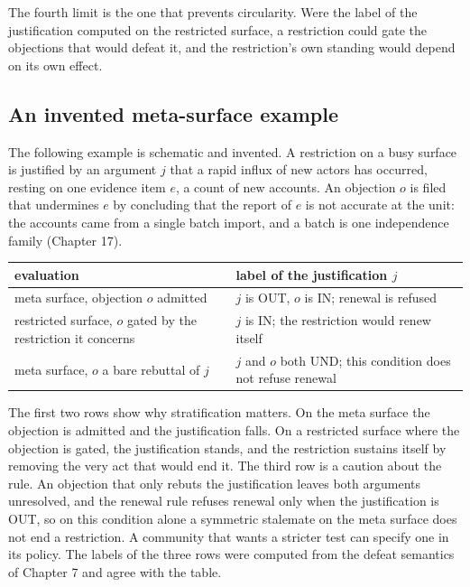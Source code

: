 \documentclass[11pt]{article}
\newcommand{\IN}{\textsf{IN}}
\newcommand{\UND}{\textsf{UND}}
\newcommand{\OUT}{\textsf{OUT}}
\begin{document}
The fourth limit is the one that prevents circularity. Were the label of the justification computed on the restricted surface, a restriction could gate the objections that would defeat it, and the restriction's own standing would depend on its own effect.

\subsection{An invented meta-surface example}

The following example is schematic and invented. A restriction on a busy surface is justified by an argument $j$ that a rapid influx of new actors has occurred, resting on one evidence item $e$, a count of new accounts. An objection $o$ is filed that undermines $e$ by concluding that the report of $e$ is not accurate at the unit: the accounts came from a single batch import, and a batch is one independence family (Chapter 17).

\begin{center}
\small
\begin{tabularx}{\textwidth}{@{}>{\raggedright\arraybackslash}p{} X@{}}
\toprule
evaluation & label of the justification $j$\\
\midrule
meta surface, objection $o$ admitted & $j$ is \OUT{}, $o$ is \IN{}; renewal is refused\\
restricted surface, $o$ gated by the restriction it concerns & $j$ is \IN{}; the restriction would renew itself\\
meta surface, $o$ a bare rebuttal of $j$ & $j$ and $o$ both \UND{}; this condition does not refuse renewal\\
\bottomrule
\end{tabularx}
\end{center}

The first two rows show why stratification matters. On the meta surface the objection is admitted and the justification falls. On a restricted surface where the objection is gated, the justification stands, and the restriction sustains itself by removing the very act that would end it. The third row is a caution about the rule. An objection that only rebuts the justification leaves both arguments unresolved, and the renewal rule refuses renewal only when the justification is \OUT{}, so on this condition alone a symmetric stalemate on the meta surface does not end a restriction. A community that wants a stricter test can specify one in its policy. The labels of the three rows were computed from the defeat semantics of Chapter 7 and agree with the table.
\end{document}
